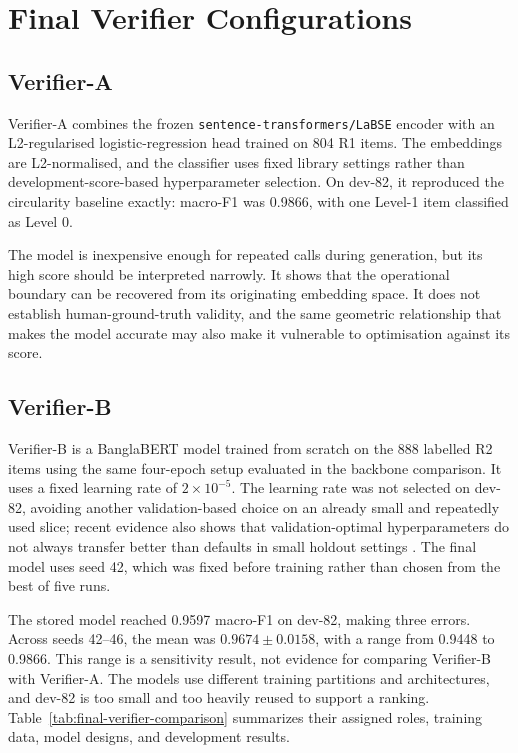 \section{Final Verifier Configurations}

\subsection{Verifier-A}

Verifier-A combines the frozen \texttt{sentence-transformers/LaBSE} encoder \cite{b3} with an L2-regularised logistic-regression head trained on 804 R1 items. The embeddings are L2-normalised, and the classifier uses fixed library settings rather than development-score-based hyperparameter selection. On dev-82, it reproduced the circularity baseline exactly: macro-F1 was 0.9866, with one Level-1 item classified as Level 0.

The model is inexpensive enough for repeated calls during generation, but its high score should be interpreted narrowly. It shows that the operational boundary can be recovered from its originating embedding space. It does not establish human-ground-truth validity, and the same geometric relationship that makes the model accurate may also make it vulnerable to optimisation against its score.

\subsection{Verifier-B}

Verifier-B is a BanglaBERT model \cite{b2} trained from scratch on the 888 labelled R2 items using the same four-epoch setup evaluated in the backbone comparison. It uses a fixed learning rate of $2\times10^{-5}$. The learning rate was not selected on dev-82, avoiding another validation-based choice on an already small and repeatedly used slice; recent evidence also shows that validation-optimal hyperparameters do not always transfer better than defaults in small holdout settings \cite{b82}. The final model uses seed 42, which was fixed before training rather than chosen from the best of five runs.

The stored model reached 0.9597 macro-F1 on dev-82, making three errors. Across seeds 42--46, the mean was $0.9674\pm0.0158$, with a range from 0.9448 to 0.9866. This range is a sensitivity result, not evidence for comparing Verifier-B with Verifier-A. The models use different training partitions and architectures, and dev-82 is too small and too heavily reused to support a ranking. Table~\ref{tab:final-verifier-comparison} summarizes their assigned roles, training data, model designs, and development results.

